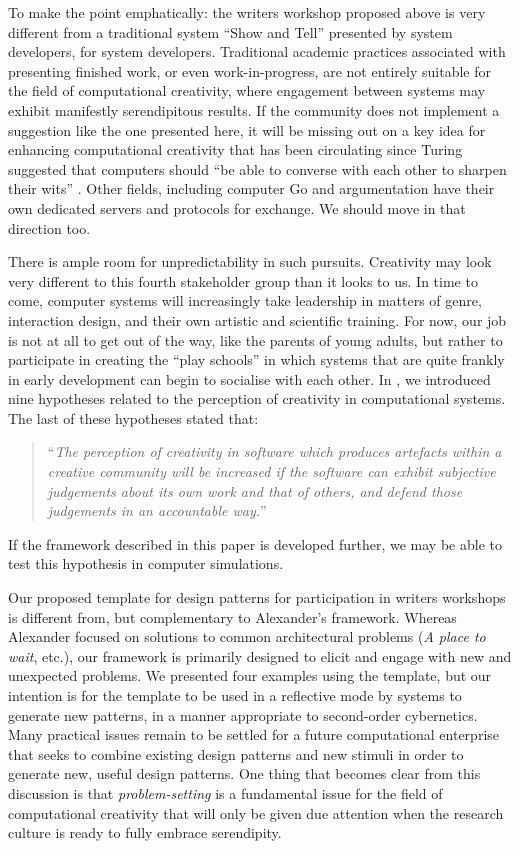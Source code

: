 \documentclass{llncs}
\begin{document}
To make the point emphatically: the writers workshop proposed above is
very different from a traditional system ``Show and Tell'' presented
by system developers, for system developers.  Traditional academic
practices associated with presenting finished work, or even
work-in-progress, are not entirely suitable for the field of
computational creativity, where engagement between systems may exhibit
manifestly serendipitous results.  If the community does not implement
a suggestion like the one presented here, it will be missing out on a
key idea for enhancing computational creativity that has been
circulating since Turing suggested that computers should ``be able to
converse with each other to sharpen their wits''
\cite{turing-intelligent}.  Other fields, including computer Go
\cite{bouzy2001computer} and argumentation \cite{yuan2008towards} have
their own dedicated servers and protocols for exchange.  We should
move in that direction too.

There is ample room for unpredictability in such pursuits.  Creativity
may look very different to this fourth stakeholder group than it looks
to us.  In time to come, computer systems will increasingly take
leadership in matters of genre, interaction design, and their own
artistic and scientific training.  For now, our job is not at all to
get out of the way, like the parents of young adults, but rather to
participate in creating the ``play schools'' in which systems that are
quite frankly in early development can begin to socialise with each
other.
%
In \cite{stakeholder-groups-bookchapter}, we introduced nine
hypotheses related to the perception of creativity in computational
systems. 
The last of these hypotheses stated that:
\begin{quote}
``\emph{The perception of creativity in software which produces
  artefacts within a creative community will be increased if the
  software can exhibit subjective judgements about its own work and
  that of others, and defend those judgements in an accountable
  way.}''~\cite{stakeholder-groups-bookchapter}
\end{quote}
If the framework described in this paper is developed further, we may
be able to test this hypothesis in computer simulations.

Our proposed template for design patterns for participation in writers
workshops is different from, but complementary to Alexander's
framework.  Whereas Alexander focused on solutions to common
architectural problems (\emph{A place to wait}, etc.), our framework
is primarily designed to elicit and engage with new and unexpected
problems.  We presented four examples using the template, but our
intention is for the template to be used in a reflective mode by
systems to generate new patterns, in a manner appropriate to
second-order cybernetics.  Many practical issues remain to be settled
for a future computational enterprise that seeks to combine existing
design patterns and new stimuli in order to generate new, useful
design patterns.  One thing that becomes clear from this discussion is
that \emph{problem-setting} is a fundamental issue for the field of
computational creativity that will only be given due attention when
the research culture is ready to fully embrace serendipity.
\end{document}
